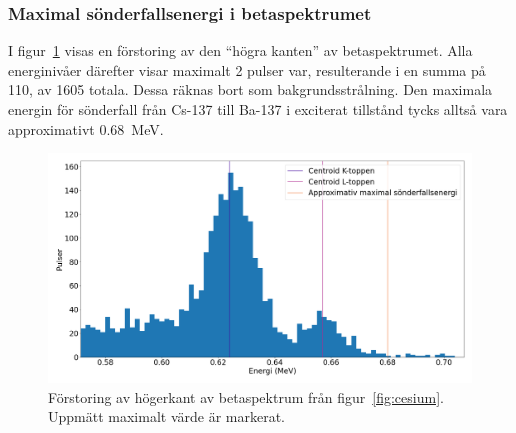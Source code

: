 \subsubsection{Maximal sönderfallsenergi i betaspektrumet} \label{sec:betamax}

I figur~\ref{fig:cesiummax} visas en förstoring av den ``högra kanten'' av
betaspektrumet. Alla energinivåer därefter visar maximalt \num{2} pulser var,
resulterande i en summa på 110, av \num{1605} totala. Dessa räknas bort som
bakgrundsstrålning. Den maximala energin för sönderfall från Cs-137 till Ba-137
i exciterat tillstånd tycks alltså vara approximativt \qty{0.68}{\MeV}.

\begin{figure}[!hp]
    \centering
    \includegraphics[width=\textwidth, keepaspectratio]{../images/cesium_max.png}
    \caption{
        Förstoring av högerkant av betaspektrum från figur~\ref{fig:cesium}.
        Uppmätt maximalt värde är markerat.
    }
    \label{fig:cesiummax}
\end{figure}
